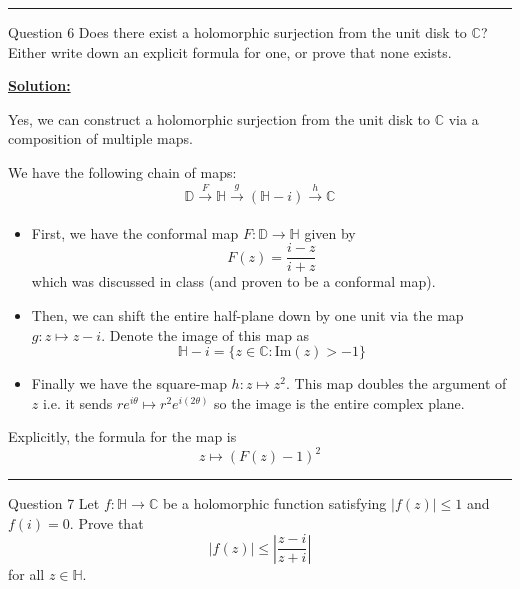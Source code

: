 \documentclass{article}
\newcommand{\C}{\mathbb{C}}
\begin{document}
\vskip 0.5cm
\hrule 
\vskip 0.5cm



\begin{mathdefinitionbox}{Question 6}
\vskip 0.5cm
Does there exist a holomorphic surjection from the unit disk to $\C$? Either write down an explicit formula for one, or prove that none exists.
\end{mathdefinitionbox}

\vskip 0.5cm
\underline{\textbf{Solution:}}

Yes, we can construct a holomorphic surjection from the unit disk to $\C$ via a composition of multiple maps. 

\vskip 0.5cm
We have the following chain of maps:
\[ \mathbb{D} \xrightarrow[]{F} \mathbb{H} \xrightarrow[]{g} \left(\mathbb{H} - i\right)  \xrightarrow[]{h} \C \]

\vskip 0.5cm
\begin{itemize}
  \item First, we have the conformal map $F : \mathbb{D} \rightarrow \mathbb{H}$ given by \[ F(z) = \frac{i-z}{i+z} \] which was discussed in class (and proven to be a conformal map). 
  \item Then, we can shift the entire half-plane down by one unit via the map $g : z \mapsto z - i$. Denote the image of this map as 
  \[ \mathbb{H} - i = \{ z \in \C : \mathrm{Im}(z) > -1 \} \]
  \item Finally we have the square-map $h : z \mapsto z^2$. This map doubles the argument of $z$ i.e. it sends $re^{i\theta} \mapsto r^2 e^{i(2\theta)}$ so the image is the entire complex plane. 
\end{itemize}

\vskip 0.5cm
Explicitly, the formula for the map is 
\[ z \mapsto \left(F(z) - 1\right)^2 \]

\vskip 0.5cm
\hrule 
\vskip 0.5cm



\begin{mathdefinitionbox}{Question 7}
\vskip 0.5cm
Let $f : \mathbb{H} \rightarrow \C$ be a holomorphic function satisfying $|f(z)| \leq 1$ and $f(i) = 0$. Prove that \[ |f(z)| \leq \left| \frac{z-i}{z+i}  \right| \] for all $z \in \mathbb{H}$.
\end{mathdefinitionbox}
\end{document}
